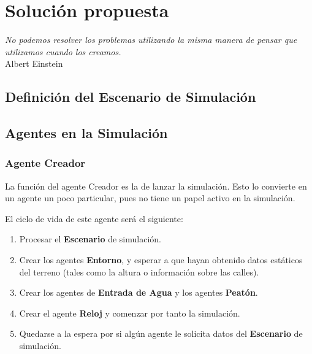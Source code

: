 
\chapter*{Solución propuesta} \label{cap3}


\begin{flushright}
\begin{minipage}{7.85cm}
    {\em No podemos resolver los problemas utilizando la misma manera de pensar
    que utilizamos cuando los creamos.} \\ Albert Einstein
\end{minipage}
\end{flushright}

\vspace*{5mm}

\section*{Definición del Escenario de Simulación}


\section*{Agentes en la Simulación}


\subsection*{Agente Creador}

La función del agente Creador es la de lanzar la simulación. Esto lo convierte
en un agente un poco particular, pues no tiene un papel activo en la
simulación.

El ciclo de vida de este agente será el siguiente:

\begin{enumerate}
 \item Procesar el {\bf Escenario} de simulación.
 \item Crear los agentes {\bf Entorno}, y esperar a que hayan obtenido datos
estáticos del terreno (tales como la altura o información sobre las calles).
 \item Crear los agentes de {\bf Entrada de Agua} y los agentes {\bf Peatón}.
 \item Crear el agente {\bf Reloj} y comenzar por tanto la simulación.
 \item Quedarse a la espera por si algún agente le solicita datos del
{\bf Escenario} de simulación.
\end{enumerate}

